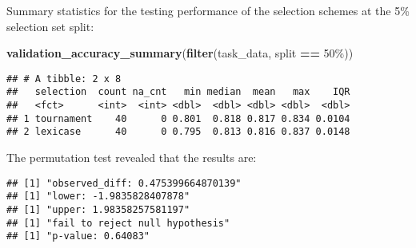 \documentclass[
]{book}
\newenvironment{Shaded}{\begin{snugshade}}{\end{snugshade}}
\newcommand{\AttributeTok}[1]{\textcolor[rgb]{0.13,0.29,0.53}{#1}}
\newcommand{\DecValTok}[1]{\textcolor[rgb]{0.00,0.00,0.81}{#1}}
\newcommand{\FunctionTok}[1]{\textcolor[rgb]{0.13,0.29,0.53}{\textbf{#1}}}
\newcommand{\NormalTok}[1]{#1}
\newcommand{\OtherTok}[1]{\textcolor[rgb]{0.56,0.35,0.01}{#1}}
\newcommand{\SpecialCharTok}[1]{\textcolor[rgb]{0.81,0.36,0.00}{\textbf{#1}}}
\newcommand{\StringTok}[1]{\textcolor[rgb]{0.31,0.60,0.02}{#1}}
\begin{document}
Summary statistics for the testing performance of the selection schemes at the 5\% selection set split:

\begin{Shaded}
\begin{Highlighting}[]
\FunctionTok{validation\_accuracy\_summary}\NormalTok{(}\FunctionTok{filter}\NormalTok{(task\_data, split }\SpecialCharTok{==} \StringTok{\textquotesingle{}50\%\textquotesingle{}}\NormalTok{))}
\end{Highlighting}
\end{Shaded}

\begin{verbatim}
## # A tibble: 2 x 8
##   selection  count na_cnt   min median  mean   max    IQR
##   <fct>      <int>  <int> <dbl>  <dbl> <dbl> <dbl>  <dbl>
## 1 tournament    40      0 0.801  0.818 0.817 0.834 0.0104
## 2 lexicase      40      0 0.795  0.813 0.816 0.837 0.0148
\end{verbatim}

The permutation test revealed that the results are:

\begin{Shaded}
\end{Shaded}

\begin{verbatim}
## [1] "observed_diff: 0.475399664870139"
## [1] "lower: -1.9835828407878"
## [1] "upper: 1.98358257581197"
## [1] "fail to reject null hypothesis"
## [1] "p-value: 0.64083"
\end{verbatim}
\end{document}
